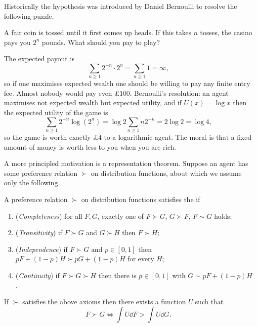 \documentclass[a4paper]{scrartcl}
\begin{document}
Historically the hypothesis was introduced by Daniel Bernoulli to resolve the following puzzle.

\begin{example}
	A fair coin is tossed until it first comes up heads. If this takes $n$ tosses, the casino pays you $2^n$ pounds. What should you pay to play?

	The expected payout is
	$$
	\sum_{n\geq 1} 2^{-n}\cdot 2^n = \sum_{n \geq 1} 1 = \infty,
	$$
	so if one maximises expected wealth one should be willing to pay any finite entry fee. Almost nobody would pay even $\pounds 100$. Bernoulli's resolution: an agent maximises not expected wealth but expected utility, and if $U(x) = \log x$ then the expected utility of the game is
	$$
	\sum_{n \geq 1}2^{-n}\log(2^n) = \log 2\sum_{n\geq 1}n2^{-n} = 2\log 2 = \log 4,
	$$
	so the game is worth exactly $\pounds 4$ to a logarithmic agent. The moral is that a fixed amount of money is worth less to you when you are rich.
\end{example}

A more principled motivation is a representation theorem. Suppose an agent has some preference relation $\succ$ on distribution functions, about which we assume only the following.

\begin{definition}
	A preference relation $\succ$ on distribution functions satisfies the  if
	\begin{enumerate}[label=(\roman*)]
		\item (\emph{Completeness}) for all $F,G$, exactly one of $F \succ G$, $G \succ F$, $F \sim G$ holds;
		\item (\emph{Transitivity}) if $F \succ G$ and $G \succ H$ then $F \succ H$;
		\item (\emph{Independence}) if $F \succ G$ and $p \in [0,1]$ then $pF + (1-p)H \succ pG + (1-p)H$ for every $H$;
		\item (\emph{Continuity}) if $F \succ G \succ H$ then there is $p \in [0,1]$ with $G \sim pF + (1-p)H$.
	\end{enumerate}
\end{definition}

\begin{theorem}
	If $\succ$ satisfies the above axioms then there exists a function $U$ such that
	$$
	F \succ G \iff \int U \dd F > \int U \dd G.
	$$
\end{theorem}
\end{document}
